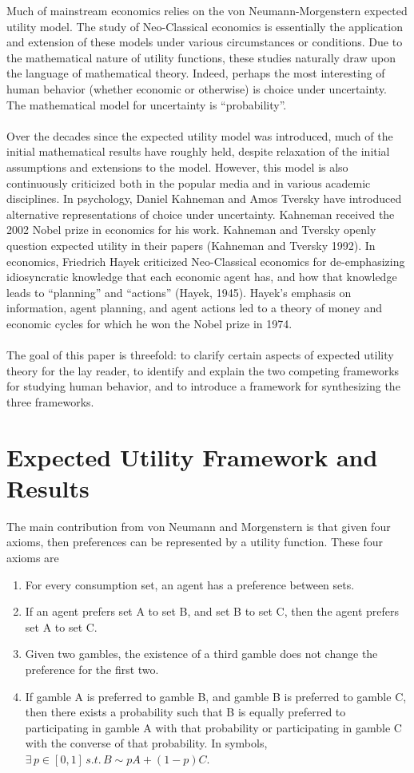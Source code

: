 \documentclass{article}
\begin{document}
Much of mainstream economics relies on the von Neumann-Morgenstern expected utility model.  The study of Neo-Classical economics is essentially the application and extension of these models under various circumstances or conditions.  Due to the mathematical nature of utility functions, these studies naturally draw upon the language of mathematical theory.  Indeed, perhaps the most interesting of human behavior (whether economic or otherwise) is choice under uncertainty.  The mathematical model for uncertainty is ``probability''.  
\\
\\
Over the decades since the expected utility model was introduced, much of the initial mathematical results have roughly held, despite relaxation of the initial assumptions and extensions to the model.  However, this model is also continuously criticized both in the popular media and in various academic disciplines.  In psychology, Daniel Kahneman and Amos Tversky have introduced alternative representations of choice under uncertainty.  Kahneman received the 2002 Nobel prize in economics for his work.  Kahneman and Tversky openly question expected utility in their papers (Kahneman and Tversky 1992).  In economics, Friedrich Hayek criticized Neo-Classical economics for de-emphasizing idiosyncratic knowledge that each economic agent has, and how that knowledge leads to ``planning'' and ``actions'' (Hayek, 1945).  Hayek's emphasis on information, agent planning, and agent actions led to a theory of money and economic cycles for which he won the Nobel prize in 1974.  
\\
\\
The goal of this paper is threefold: to clarify certain aspects of expected utility theory for the lay reader, to identify and explain the two competing frameworks for studying human behavior, and to introduce a framework for synthesizing the three frameworks.  

\section{Expected Utility Framework and Results}
The main contribution from von Neumann and Morgenstern is that given four axioms, then preferences can be represented by a utility function.  These four axioms are
\begin{enumerate}
	\item For every consumption set, an agent has a preference between sets.
	\item If an agent prefers set A to set B, and set B to set C, then the agent prefers set A to set C.
	\item Given two gambles, the existence of a third gamble does not change the preference for the first two.
	\item If gamble A is preferred to gamble B, and gamble B is preferred to gamble C, then there exists a probability such that B is equally preferred to participating in gamble A with that probability or participating in gamble C with the converse of that probability.  In symbols, \(\exists \, p \in [0, 1] \, s.t.\, B \sim pA+(1-p)C\).  
\end{enumerate}
\end{document}
